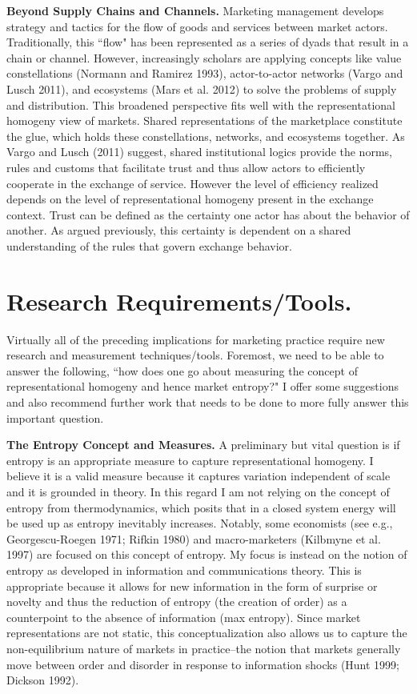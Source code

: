 \textbf{Beyond Supply Chains and Channels.}
Marketing management develops strategy and tactics for the flow of goods and services between market actors. Traditionally, this ``flow" has been represented as a series of dyads that result in a chain or channel. However, increasingly scholars are applying concepts like value constellations (Normann and Ramirez 1993), actor-to-actor networks (Vargo and Lusch 2011), and ecosystems (Mars et al. 2012) to solve the problems of supply and distribution. This broadened perspective fits well with the representational homogeny view of markets. Shared representations of the marketplace constitute the glue, which holds these constellations, networks, and ecosystems together. As Vargo and Lusch (2011) suggest, shared institutional logics provide the norms, rules and customs that facilitate trust and thus allow actors to efficiently cooperate in the exchange of service. However the level of efficiency realized depends on the level of representational homogeny present in the exchange context. Trust can be defined as the certainty one actor has about the behavior of another. As argued previously, this certainty is dependent on a shared understanding of the rules that govern exchange behavior. 

\section{Research Requirements/Tools.}
Virtually all of the preceding implications for marketing practice require new research and measurement techniques/tools. Foremost, we need to be able to answer the following, ``how does one go about measuring the concept of representational homogeny and hence market entropy?" I offer some suggestions and also recommend further work that needs to be done to more fully answer this important question. 

\textbf{The Entropy Concept and Measures.}
A preliminary but vital question is if entropy is an appropriate measure to capture representational homogeny. I believe it is a valid measure because it captures variation independent of scale and it is grounded in theory. In this regard I am not relying on the concept of entropy from thermodynamics, which posits that in a closed system energy will be used up as entropy inevitably increases. Notably, some economists (see e.g., Georgescu-Roegen 1971; Rifkin 1980) and macro-marketers (Kilbmyne et al. 1997) are focused on this concept of entropy. My focus is instead on the notion of entropy as developed in information and communications theory. This is appropriate because it allows for new information in the form of surprise or novelty and thus the reduction of entropy (the creation of order) as a counterpoint to the absence of information (max entropy). Since market representations are not static, this conceptualization also allows us to capture the non-equilibrium nature of markets in practice--the notion that markets generally move between order and disorder in response to information shocks (Hunt 1999; Dickson 1992). 

